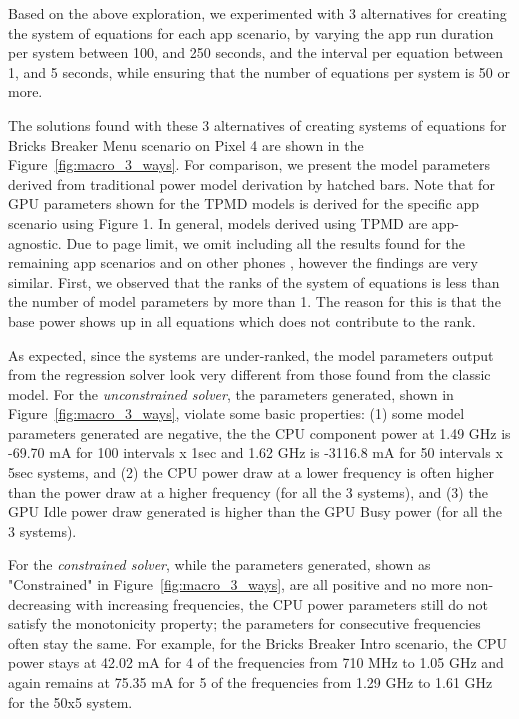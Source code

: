 Based on the above exploration, we experimented with 3 alternatives for creating the system of equations for each app scenario, by varying
the app run duration per system between 100, and 250 seconds, and
the interval  per equation between 1, and 5 seconds, while ensuring that the number
of equations per system is 50 or more.

The solutions found with  these  3 alternatives of creating systems of equations for Bricks Breaker Menu scenario on Pixel 4 are
shown in the Figure~\ref{fig:macro_3_ways}. For comparison, we present the model parameters 
derived from traditional power model derivation by hatched bars. Note that for GPU parameters 
shown for the TPMD models is derived for the specific app scenario using Figure 1. In general, models derived using TPMD are app-agnostic. Due to page limit, we omit including all the results
found for the remaining app scenarios and 
on other phones , however the findings are very similar.
First, we observed that the ranks of the system of equations  is less than the number of model parameters by more than 1. 
The reason for this is that the base power shows up in all equations which does not contribute to the 
rank. 

As expected, since the systems are under-ranked,
the model parameters output from the regression solver look very different from those found from the classic model. 
For the {\it unconstrained solver},
the parameters generated, shown in Figure~\ref{fig:macro_3_ways},
violate some basic properties:
(1) some model parameters generated are negative, \eg the the CPU component power at 1.49 GHz is -69.70 mA for 100 intervals x 1sec  and 1.62 GHz is -3116.8 mA for 50 intervals x 5sec systems, and 
(2) the CPU power draw at a lower frequency is often higher than the power draw at a higher frequency (for all the 3 systems), and 
(3) the GPU Idle power draw generated is higher than the GPU Busy power (for all the 3 systems).

For the {\it constrained solver}, while the parameters generated, shown as 
"Constrained" in Figure~\ref{fig:macro_3_ways}, are all
positive and no more non-decreasing with increasing frequencies, the CPU power parameters
still do not satisfy the monotonicity property; the parameters for consecutive frequencies
often stay the same. For example, for the Bricks Breaker Intro scenario, 
the CPU power stays at 42.02 mA for 4 of the frequencies from 710 MHz to 1.05 GHz and again remains at 75.35 mA for 5 of the frequencies from 1.29 GHz to 1.61 GHz for the 50x5 system.

